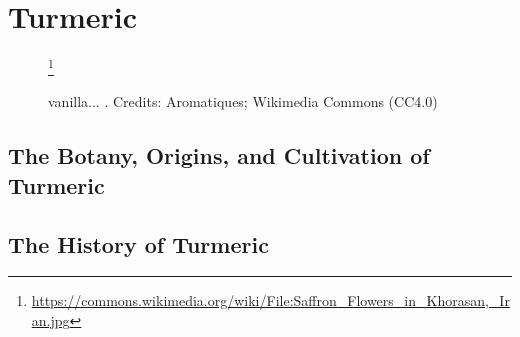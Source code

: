 \section{Turmeric}
\label{sec:turmeric}



\begin{figure}[!ht]
	\vspace{-4ex}
	\centering
	\hfill
	\hfill
	\caption{vanilla... . Credits: Aromatiques; Wikimedia Commons (CC4.0)}\footnote{\url{https://commons.wikimedia.org/wiki/File:Saffron_Flowers_in_Khorasan,_Iran.jpg}}
	\label{fig:turmeric_imgs}
\end{figure}

\subsection{The Botany, Origins, and Cultivation of Turmeric}

\subsection{The History of Turmeric}

